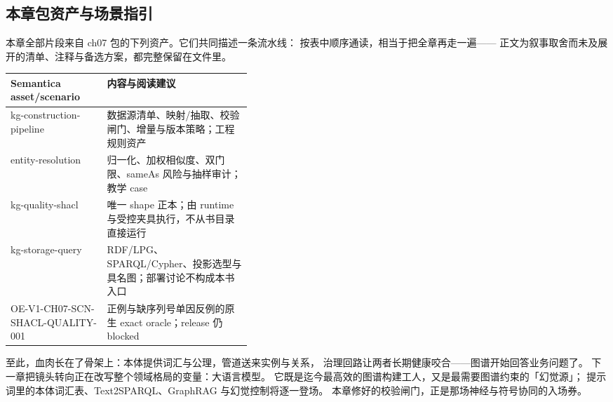 \subsection{本章包资产与场景指引}

本章全部片段来自 ch07 包的下列资产。它们共同描述一条流水线：
按表中顺序通读，相当于把全章再走一遍——
正文为叙事取舍而未及展开的清单、注释与备选方案，都完整保留在文件里。

\begin{center}
\begin{tabularx}{\linewidth}{@{}>{\ttfamily\footnotesize}p{0.40\linewidth}X@{}}
\toprule
\normalfont\textbf{Semantica asset/scenario} & \textbf{内容与阅读建议} \\
\midrule
kg-construction-pipeline & 数据源清单、映射/抽取、校验闸门、增量与版本策略；工程规则资产 \\
entity-resolution & 归一化、加权相似度、双门限、sameAs 风险与抽样审计；教学 case \\
kg-quality-shacl & 唯一 shape 正本；由 runtime 与受控夹具执行，不从书目录直接运行 \\
kg-storage-query & RDF/LPG、SPARQL/Cypher、投影选型与具名图；部署讨论不构成本书入口 \\
OE-V1-CH07-SCN-SHACL-QUALITY-001 & 正例与缺序列号单因反例的原生 exact oracle；release 仍 blocked \\
\bottomrule
\end{tabularx}
\end{center}

至此，血肉长在了骨架上：本体提供词汇与公理，管道送来实例与关系，
治理回路让两者长期健康咬合——图谱开始回答业务问题了。
下一章把镜头转向正在改写整个领域格局的变量：大语言模型。
它既是迄今最高效的图谱构建工人，又是最需要图谱约束的「幻觉源」；
提示词里的本体词汇表、Text2SPARQL、GraphRAG 与幻觉控制将逐一登场。
本章修好的校验闸门，正是那场神经与符号协同的入场券。

